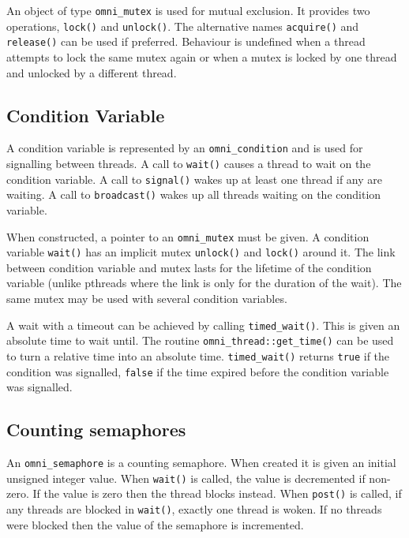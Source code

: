 \documentclass[11pt,oneside,a4paper]{article}
\begin{document}
An object of type \texttt{omni\_mutex} is used for mutual exclusion.
It provides two operations, \texttt{lock()} and \texttt{unlock()}.
The alternative names \texttt{acquire()} and \texttt{release()} can be
used if preferred.  Behaviour is undefined when a thread attempts to
lock the same mutex again or when a mutex is locked by one thread and
unlocked by a different thread.


\subsection{Condition Variable}

A condition variable is represented by an \texttt{omni\_condition} and
is used for signalling between threads.  A call to \texttt{wait()}
causes a thread to wait on the condition variable.  A call to
\texttt{signal()} wakes up at least one thread if any are waiting.  A
call to \texttt{broadcast()} wakes up all threads waiting on the
condition variable.

When constructed, a pointer to an \texttt{omni\_mutex} must be given.
A condition variable \texttt{wait()} has an implicit mutex
\texttt{unlock()} and \texttt{lock()} around it.  The link between
condition variable and mutex lasts for the lifetime of the condition
variable (unlike pthreads where the link is only for the duration of
the wait).  The same mutex may be used with several condition
variables.

A wait with a timeout can be achieved by calling
\texttt{timed\_wait()}.  This is given an absolute time to wait until.
The routine \texttt{omni\_thread::get\_time()} can be used to turn a
relative time into an absolute time.  \texttt{timed\_wait()} returns
\texttt{true} if the condition was signalled, \texttt{false} if the
time expired before the condition variable was signalled.


\subsection{Counting semaphores}

An \texttt{omni\_semaphore} is a counting semaphore.  When created it
is given an initial unsigned integer value.  When \texttt{wait()} is
called, the value is decremented if non-zero.  If the value is zero
then the thread blocks instead.  When \texttt{post()} is called, if
any threads are blocked in \texttt{wait()}, exactly one thread is
woken. If no threads were blocked then the value of the semaphore is
incremented.
\end{document}

